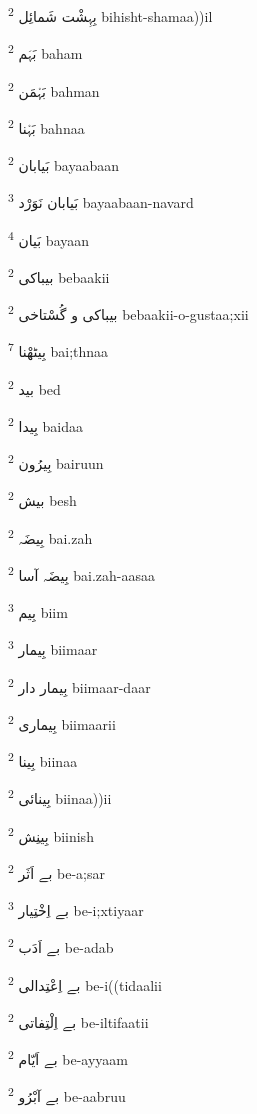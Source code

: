 \documentclass[12pt]{article}
\begin{document}
\begin{multicols}{5}
{\ur بِہِشْت شَمائِل}   \textsuperscript{2} bihisht-shamaa))il

{\ur بَہَم}   \textsuperscript{2} baham

{\ur بَہْمَن}   \textsuperscript{2} bahman

{\ur بَہْنا}   \textsuperscript{2} bahnaa

{\ur بَیابان}   \textsuperscript{2} bayaabaan

{\ur بَیابان نَوَرْد}   \textsuperscript{3} bayaabaan-navard

{\ur بَیان}   \textsuperscript{4} bayaan

{\ur بیباکی}   \textsuperscript{2} bebaakii

{\ur بیباکی و گُسْتاخی}   \textsuperscript{2} bebaakii-o-gustaa;xii

{\ur بِیٹھْنا}   \textsuperscript{7} bai;thnaa

{\ur بید}   \textsuperscript{2} bed

{\ur بِیدا}   \textsuperscript{2} baidaa

{\ur بِیرُون}   \textsuperscript{2} bairuun

{\ur بیش}   \textsuperscript{2} besh

{\ur بِیضَہ}   \textsuperscript{2} bai.zah

{\ur بِیضَہ آسا}   \textsuperscript{2} bai.zah-aasaa

{\ur بِیم}   \textsuperscript{3} biim

{\ur بِیمار}   \textsuperscript{3} biimaar

{\ur بِیمار دار}   \textsuperscript{2} biimaar-daar

{\ur بِیماری}   \textsuperscript{2} biimaarii

{\ur بِینا}   \textsuperscript{2} biinaa

{\ur بِینائی}   \textsuperscript{2} biinaa))ii

{\ur بِینِش}   \textsuperscript{2} biinish

{\ur بے اَثَر}   \textsuperscript{2} be-a;sar

{\ur بے اِخْتِیار}   \textsuperscript{3} be-i;xtiyaar

{\ur بے اَدَب}   \textsuperscript{2} be-adab

{\ur بے اِعْتِدالی}   \textsuperscript{2} be-i((tidaalii

{\ur بے اِلْتِفاتی}   \textsuperscript{2} be-iltifaatii

{\ur بے اَیّام}   \textsuperscript{2} be-ayyaam

{\ur بے آبْرُو}   \textsuperscript{2} be-aabruu


\end{multicols}
\end{document}
